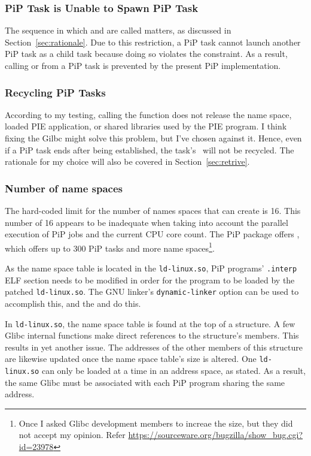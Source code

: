 \subsubsection{PiP Task is Unable to Spawn PiP Task}

The sequence in which  and  are
called matters, as discussed in Section~\ref{sec:rationale}. Due to
this restriction, a PiP task cannot launch another PiP task as a child
task because doing so violates the constraint. As a result, calling
 or  from a PiP task is
prevented by the present PiP implementation. 

\subsubsection{Recycling PiP Tasks}\label{sec:recycle}

According to my testing, calling the  function does
not release the name space, loaded PIE application, or shared
libraries used by the PIE program. I think fixing the Gilbc might
solve this problem, but I've chosen against it. Hence, even if a PiP
task ends after being established, the task's \PIPID\ will not be
recycled. The rationale for my choice will also be covered in
Section~\ref{sec:retrive}. 

\subsubsection{Number of name spaces}\label{sec:name-space}

The hard-coded limit for the number of names spaces that
 can create is 16. This number of 16 appears to be
inadequate when taking into account the parallel execution of PiP jobs
and the current CPU core count. The PiP package offers \pipglibc,
which offers up to 300 PiP tasks and more name spaces\footnote{Once I
  asked Glibc development members to increae the size, but they did
  not accept my opinion. Refer
  \url{https://sourceware.org/bugzilla/show_bug.cgi?id=23978}}.

As the name space table is located in the {\tt ld-linux.so}, PiP
programs' {\tt .interp} ELF section needs to be modified in order for
the program to be loaded by the patched {\tt ld-linux.so}. The GNU
linker's {\tt {}dynamic-linker} option can be used to accomplish this,
and the  and  do this.

In {\tt ld-linux.so}, the name space table is found at the top of a
structure. A few Glibc internal functions make direct references to the
structure's members. This results in yet another issue. The addresses
of the other members of this structure are likewise updated once
the name space table's size is altered. One {\tt ld-linux.so} can only
be loaded at a time in an address space, as stated. As a result, the same
Glibc must be associated with each PiP program sharing the same
address.

